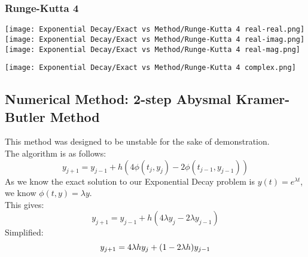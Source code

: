 \newpage
\subsubsection{Runge-Kutta 4}
\begin{multicols}{2}
\begin{center}
	\texttt{[image: Exponential Decay/Exact vs Method/Runge-Kutta 4 real-real.png]}
	\texttt{[image: Exponential Decay/Exact vs Method/Runge-Kutta 4 real-imag.png]}
	\texttt{[image: Exponential Decay/Exact vs Method/Runge-Kutta 4 real-mag.png]}
\end{center}
\columnbreak{}
\begin{center}
	\texttt{[image: Exponential Decay/Exact vs Method/Runge-Kutta 4 complex.png]}
\end{center}
\end{multicols}
\subsection{Numerical Method: 2-step Abysmal Kramer-Butler Method}

\par This method was designed to be unstable for the sake of demonstration.\\
The algorithm is as follows:
\[y_{j+1} = y_{j-1} + h(4\phi(t_j,y_j)-2\phi(t_{j-1},y_{j-1}))\]
As we know the exact solution to our Exponential Decay problem is $y(t) = e^{\lambda t}$, we know $\phi(t,y) = \lambda y$.\\
This gives:\\
\[y_{j+1} = y_{j-1} + h(4\lambda y_j - 2\lambda y_{j-1})\]
Simplified:\\
\[y_{j+1} = 4\lambda h y_j + (1-2\lambda h) y_{j-1}\]
